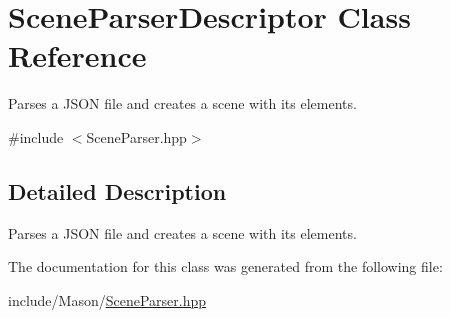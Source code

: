 \hypertarget{class_scene_parser_descriptor}{}\section{Scene\+Parser\+Descriptor Class Reference}
\label{class_scene_parser_descriptor}


Parses a J\+S\+ON file and creates a scene with its elements.  




{\ttfamily \#include $<$Scene\+Parser.\+hpp$>$}



\subsection{Detailed Description}
Parses a J\+S\+ON file and creates a scene with its elements. 

The documentation for this class was generated from the following file\+:\begin{DoxyCompactItemize}
\item 
include/\+Mason/\hyperlink{_scene_parser_8hpp}{Scene\+Parser.\+hpp}\end{DoxyCompactItemize}
